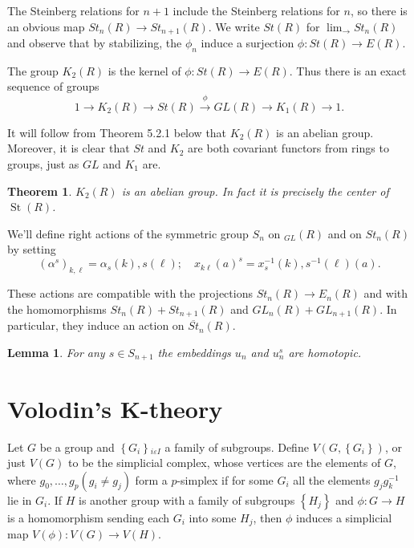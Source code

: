 \documentclass{book}
\newtheorem{theo}{Theorem}
\newtheorem{lemm}{Lemma}
\begin{document}
The Steinberg relations for $n+1$ include the Steinberg relations for $n$, so there is an obvious map $S t_n(R) \rightarrow S t_{n+1}(R)$. We write $S t(R)$ for $\lim _{\longrightarrow} S t_n(R)$ and observe that by stabilizing, the $\phi_n$ induce a surjection $\phi: S t(R) \rightarrow E(R)$.


The group $K_2(R)$ is the kernel of $\phi: S t(R) \rightarrow E(R)$. Thus there is an exact sequence of groups
$$
1 \rightarrow K_2(R) \rightarrow S t(R) \xrightarrow{\phi} G L(R) \rightarrow K_1(R) \rightarrow 1 .
$$

It will follow from Theorem 5.2.1 below that $K_2(R)$ is an abelian group. Moreover, it is clear that $S t$ and $K_2$ are both covariant functors from rings to groups, just as $G L$ and $K_1$ are.

\begin{theo}
$K_2(R)$ is an abelian group. In fact it is precisely the center of $\operatorname{St}(R)$.
\end{theo}

We'll define right actions of the symmetric group $S_n$ on ${ }_{G L}(R)$ and on $S t_n(R)$ by setting
$$
\left(\alpha^s\right)_{k, \ell}=\alpha_s(k), s(\ell) ; \quad x_{k \ell}(a)^s=x_s^{-1}(k), s^{-1}(\ell)(a) .
$$

These actions are compatible with the projections $S t_n(R) \rightarrow E_n(R)$ and with the homomorphisms $S t_n(R)+S t_{n+1}(R)$ and $G L_n(R)+G L_{n+1}(R)$. In particular, they induce an action on $\overline{S t}_n(R)$.

\begin{lemm}
    For any $s \in S_{n+1}$ the embeddings $u_n$ and $u_n^s$ are homotopic.
\end{lemm} 



\section{Volodin's K-theory}

Let $G$ be a group and $\left\{G_i\right\}{ }_{i \varepsilon I}$ a family of subgroups. Define $V\left(G,\left\{G_i\right\}\right)$, or just $V(G)$ to be the simplicial complex, whose vertices are the elements of $G$, where $g_0, \ldots, g_p\left(g_i \neq g_j\right)$ form a $p$-simplex if for some $G_i$ all the elements $g_j g_k^{-1}$ lie in $G_i$. If $H$ is another group with a family of subgroups $\left\{H_j\right\}$ and $\phi: G \rightarrow H$ is a homomorphism sending each $G_i$ into some $H_j$, then $\phi$ induces a simplicial map $V(\phi): V(G) \rightarrow V(H)$.
\end{document}
